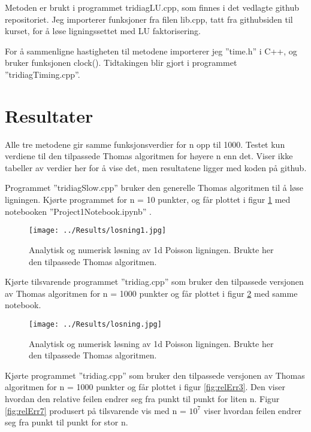 \documentclass[reprint,english,notitlepage]{revtex4-1}
\begin{document}
	Metoden er brukt i programmet tridiagLU.cpp, som finnes i det vedlagte github repositoriet\cite{myRepo}. Jeg importerer funksjoner fra filen lib.cpp, tatt fra githubsiden til kurset\cite{libRepo}, for å løse ligningssettet med LU faktorisering.
	
	For å sammenligne hastigheten til metodene importerer jeg ''time.h'' i C++, og bruker funksjonen clock(). Tidtakingen blir gjort i programmet ''tridiagTiming.cpp''.

\section{Resultater} %
	Alle tre metodene gir samme funksjonsverdier for n opp til 1000. Testet kun verdiene til den tilpassede Thomas algoritmen for høyere n enn det. Viser ikke tabeller av verdier her for å vise det, men resultatene ligger med koden på github\cite{myRepo}.
	
	Programmet ''tridiagSlow.cpp'' bruker den generelle Thomas algoritmen til å løse ligningen. Kjørte programmet for n = 10 punkter, og får plottet i figur \ref{fig:losning1} med notebooken ''Project1Notebook.ipynb'' \cite{myRepo}.

	\begin{figure}[H]
		\texttt{[image: ../Results/losning1.jpg]}
		\caption{Analytisk og numerisk løsning av 1d Poisson ligningen. Brukte her den tilpassede Thomas algoritmen.}
		\label{fig:losning1}
	\end{figure}

	Kjørte tilsvarende programmet ''tridiag.cpp'' som bruker den tilpassede versjonen av Thomas algoritmen for n = 1000 punkter og får plottet i figur \ref{fig:losning} med samme notebook.

	\begin{figure}[H]
		\texttt{[image: ../Results/losning.jpg]}
		\caption{Analytisk og numerisk løsning av 1d Poisson ligningen. Brukte her den tilpassede Thomas algoritmen.}
		\label{fig:losning}
	\end{figure}
	
	Kjørte programmet ''tridiag.cpp'' som bruker den tilpassede versjonen av Thomas algoritmen for n = 1000 punkter og får plottet i figur \ref{fig:relErr3}. Den viser hvordan den relative feilen endrer seg fra punkt til punkt for liten n. Figur \ref{fig:relErr7} produsert på tilsvarende vis med n = $10^7$ viser hvordan feilen endrer seg fra punkt til punkt for stor n.
	
\end{document}
